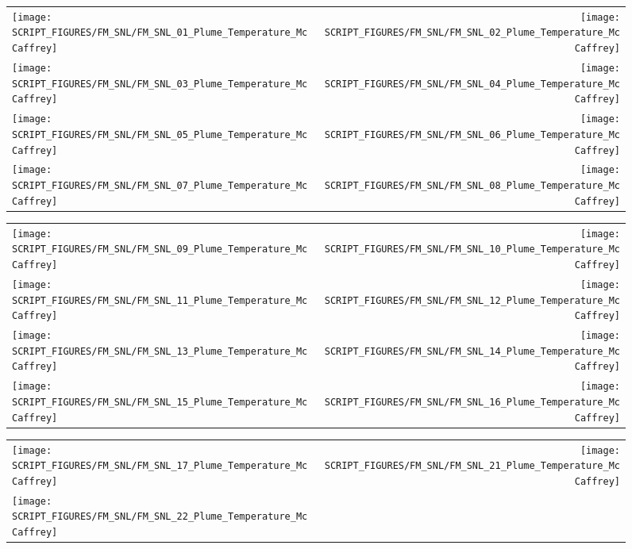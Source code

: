 \begin{figure}[!ht]
\begin{tabular*}{\textwidth}{l@{\extracolsep{\fill}}r}
\texttt{[image: SCRIPT\_FIGURES/FM\_SNL/FM\_SNL\_01\_Plume\_Temperature\_McCaffrey]} &
\texttt{[image: SCRIPT\_FIGURES/FM\_SNL/FM\_SNL\_02\_Plume\_Temperature\_McCaffrey]} \\
\texttt{[image: SCRIPT\_FIGURES/FM\_SNL/FM\_SNL\_03\_Plume\_Temperature\_McCaffrey]} &
\texttt{[image: SCRIPT\_FIGURES/FM\_SNL/FM\_SNL\_04\_Plume\_Temperature\_McCaffrey]} \\
\texttt{[image: SCRIPT\_FIGURES/FM\_SNL/FM\_SNL\_05\_Plume\_Temperature\_McCaffrey]} &
\texttt{[image: SCRIPT\_FIGURES/FM\_SNL/FM\_SNL\_06\_Plume\_Temperature\_McCaffrey]} \\
\texttt{[image: SCRIPT\_FIGURES/FM\_SNL/FM\_SNL\_07\_Plume\_Temperature\_McCaffrey]} &
\texttt{[image: SCRIPT\_FIGURES/FM\_SNL/FM\_SNL\_08\_Plume\_Temperature\_McCaffrey]}
\end{tabular*}
\end{figure}

\begin{figure}[!ht]
\begin{tabular*}{\textwidth}{l@{\extracolsep{\fill}}r}
\texttt{[image: SCRIPT\_FIGURES/FM\_SNL/FM\_SNL\_09\_Plume\_Temperature\_McCaffrey]} &
\texttt{[image: SCRIPT\_FIGURES/FM\_SNL/FM\_SNL\_10\_Plume\_Temperature\_McCaffrey]} \\
\texttt{[image: SCRIPT\_FIGURES/FM\_SNL/FM\_SNL\_11\_Plume\_Temperature\_McCaffrey]} &
\texttt{[image: SCRIPT\_FIGURES/FM\_SNL/FM\_SNL\_12\_Plume\_Temperature\_McCaffrey]} \\
\texttt{[image: SCRIPT\_FIGURES/FM\_SNL/FM\_SNL\_13\_Plume\_Temperature\_McCaffrey]} &
\texttt{[image: SCRIPT\_FIGURES/FM\_SNL/FM\_SNL\_14\_Plume\_Temperature\_McCaffrey]} \\
\texttt{[image: SCRIPT\_FIGURES/FM\_SNL/FM\_SNL\_15\_Plume\_Temperature\_McCaffrey]} &
\texttt{[image: SCRIPT\_FIGURES/FM\_SNL/FM\_SNL\_16\_Plume\_Temperature\_McCaffrey]}
\end{tabular*}
\end{figure}

\begin{figure}[!ht]
\begin{tabular*}{\textwidth}{l@{\extracolsep{\fill}}r}
\texttt{[image: SCRIPT\_FIGURES/FM\_SNL/FM\_SNL\_17\_Plume\_Temperature\_McCaffrey]} &
\texttt{[image: SCRIPT\_FIGURES/FM\_SNL/FM\_SNL\_21\_Plume\_Temperature\_McCaffrey]} \\
\texttt{[image: SCRIPT\_FIGURES/FM\_SNL/FM\_SNL\_22\_Plume\_Temperature\_McCaffrey]}
\end{tabular*}
\end{figure}


